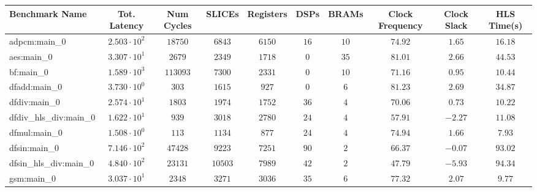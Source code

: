 \begin{tabular}{|l|c|c|c|c|c|c|c|c|c|}
\hline
Benchmark Name          & Tot. Latency           & Num Cycles & SLICEs    & Registers & DSPs    & BRAMs   & Clock Frequency & Clock Slack & HLS Time(s) \\
\hline
adpcm:main\_0           & $ 2.503 \cdot 10^{2} $ & $ 18750  $ & $ 6843  $ & $ 6150  $ & $ 16  $ & $ 10  $ & $ 74.92       $ & $ 1.65    $ & $ 16.18   $ \\
aes:main\_0             & $ 3.307 \cdot 10^{1} $ & $ 2679   $ & $ 2349  $ & $ 1718  $ & $ 0   $ & $ 35  $ & $ 81.01       $ & $ 2.66    $ & $ 44.53   $ \\
bf:main\_0              & $ 1.589 \cdot 10^{3} $ & $ 113093 $ & $ 7300  $ & $ 2331  $ & $ 0   $ & $ 10  $ & $ 71.16       $ & $ 0.95    $ & $ 10.44   $ \\
dfadd:main\_0           & $ 3.730 \cdot 10^{0} $ & $ 303    $ & $ 1615  $ & $ 927   $ & $ 0   $ & $ 6   $ & $ 81.23       $ & $ 2.69    $ & $ 34.87   $ \\
dfdiv:main\_0           & $ 2.574 \cdot 10^{1} $ & $ 1803   $ & $ 1974  $ & $ 1752  $ & $ 36  $ & $ 4   $ & $ 70.06       $ & $ 0.73    $ & $ 10.22   $ \\
dfdiv\_hls\_div:main\_0 & $ 1.622 \cdot 10^{1} $ & $ 939    $ & $ 3018  $ & $ 2780  $ & $ 24  $ & $ 4   $ & $ 57.91       $ & $ -2.27   $ & $ 11.08   $ \\
dfmul:main\_0           & $ 1.508 \cdot 10^{0} $ & $ 113    $ & $ 1134  $ & $ 877   $ & $ 24  $ & $ 4   $ & $ 74.94       $ & $ 1.66    $ & $ 7.93    $ \\
dfsin:main\_0           & $ 7.146 \cdot 10^{2} $ & $ 47428  $ & $ 9223  $ & $ 7251  $ & $ 90  $ & $ 2   $ & $ 66.37       $ & $ -0.07   $ & $ 93.02   $ \\
dfsin\_hls\_div:main\_0 & $ 4.840 \cdot 10^{2} $ & $ 23131  $ & $ 10503 $ & $ 7989  $ & $ 42  $ & $ 2   $ & $ 47.79       $ & $ -5.93   $ & $ 94.34   $ \\
gsm:main\_0             & $ 3.037 \cdot 10^{1} $ & $ 2348   $ & $ 3271  $ & $ 3036  $ & $ 35  $ & $ 6   $ & $ 77.32       $ & $ 2.07    $ & $ 9.77    $ \\

\end{tabular}
